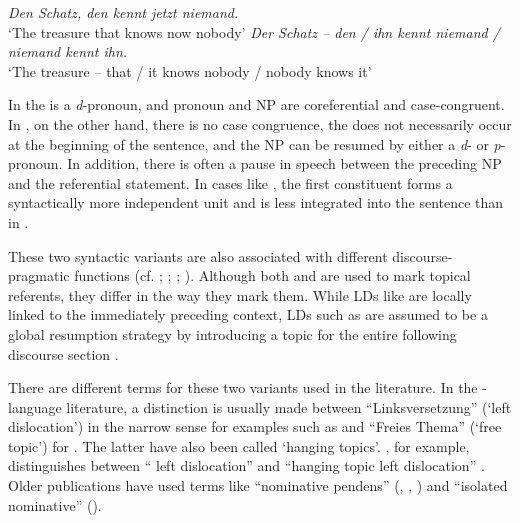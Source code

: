 \documentclass[output=paper,colorlinks,citecolor=brown]{langscibook}
\begin{document}
\ea \label{ex:zeman:ld}
\ea \label{ex:zeman:lda}
\textit{Den Schatz, den kennt jetzt niemand.}\\
\glt `The treasure that knows now nobody'
\ex \label{ex:zeman:ldb}
\textit{Der Schatz – den / ihn kennt niemand / niemand kennt ihn.}\\
\glt `The treasure – that / it knows nobody /  nobody knows it'
\z
\z

In  the  is a \textit{d}{}-pronoun, and pronoun and NP are coreferential and case-congruent. In , on the other hand, there is no case congruence, the  does not necessarily occur at the beginning of the sentence, and the NP can be resumed by either a \textit{d}- or \textit{p}-pronoun. In addition, there is often a pause in speech between the preceding NP and the referential statement. In cases like , the first constituent forms a syntactically more independent unit and is less integrated into the sentence than in . 

These two syntactic variants are also associated with different discourse-pragmatic functions (cf. \citealt{Cinque1977}; \citealt{Selting1993}; \citealt{Averintseva2007}; \citealt{Dewald2012}). Although both  and  are used to mark topical referents, they differ in the way they mark them. While LDs like  are locally linked to the immediately preceding context, LDs such as  are assumed to be a global resumption strategy by introducing a topic for the entire following discourse section \citep[309]{Selting1993}.

There are different terms for these two variants used in the literature. In the -language literature, a distinction is usually made between “Linksversetzung” (‘left dislocation') in the narrow sense for examples such as  and “Freies Thema” (‘free topic') for  \citep{Altmann1981}. The latter have also been called ‘hanging topics'. \citet{Frey2004}, for example, distinguishes between “ left dislocation” and “hanging topic left dislocation” \citep{Frey2004}. Older publications have used terms like “nominative pendens” (\citealt{Behaghel1932}, \citealt{Zäch1931}, \citealt{PaulEtAl2007}) and “isolated nominative” (\citealt[§ S 56]{PaulEtAl2007}).
\end{document}
